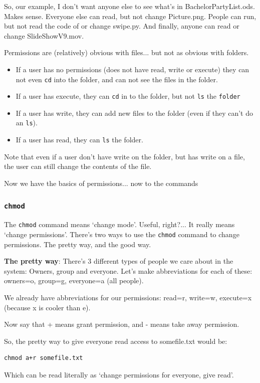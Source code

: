 So, our example, I don't want anyone else to see what's in BachelorPartyList.ods. Makes sense. Everyone else can 
read, but not change Picture.png. People can run, but not read the code of or change swipe.py. And finally, anyone can
read or change SlideShowV9.mov.

Permissions are (relatively) obvious with files... but not as obvious with folders. 
\begin{itemize}
	\item If a user has no permissions (does not have read, write or execute) they can not even {\tt cd} into the folder, and can not see the files in the folder.
	\item If a user has execute, they can {\tt cd} in to the folder, but not {\tt ls} the {\tt folder}
	\item If a user has write, they can add new files to the folder (even if they can't do an {\tt ls}).
	\item If a user has read, they can {\tt ls} the folder.
\end{itemize}
Note that even if a user don't have write on the folder, but has write on a file, the user can still change the contents of the file.

Now we have the basics of permissions... now to the commands
\subsubsection{{\tt chmod}}
	The {\tt chmod} command means `change mode'. Useful, right?... It really means `change permissions'.
	There's two ways to use the {\tt chmod} command to change permissions. The pretty way, and the good way.
	
	\textbf{The pretty way}: There's 3 different types of people we care about in the system: Owners, group and everyone.
	Let's make abbreviations for each of these: owners=o, group=g, everyone=a (all people).
	
	We already have abbreviations for our permissions: read=r, write=w, execute=x (because x is cooler than e).
	
	Now say that + means grant permission, and - means take away permission.
	
	So, the pretty way to give everyone read access to somefile.txt would be:
	\begin{verbatim}chmod a+r somefile.txt \end{verbatim}
	Which can be read literally as `change permissions for everyone, give read'.
	
